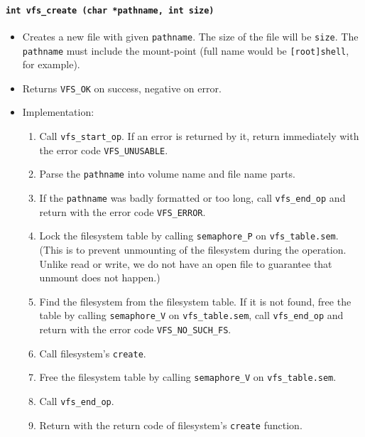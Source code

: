 \documentclass[twoside,a4paper]{report}
\makeatletter
\newenvironment{function}[3]{%
\paragraph{\texttt{#1 {\textbf{#2}} (#3)}}%
\index{#2@\texttt{#2}}%
\begin{itemize}%
}{%
\end{itemize}%
}
\makeatother
\begin{document}
\begin{function}{int}{vfs\_create}{char *pathname, int size}

\item Creates a new file with given \texttt{pathname}. The size of the
file will be \texttt{size}. The \texttt{pathname} must include the
mount-point (full name would be \texttt{[root]shell}, for example).

\item Returns \texttt{VFS\_OK} on success, negative on error.

\item Implementation:
\begin{enumerate}

\item Call \texttt{vfs\_start\_op}. If an error is returned by it,
 return immediately with the error code \texttt{VFS\_UNUSABLE}.

\item Parse the \texttt{pathname} into volume name and file name parts.

\item If the \texttt{pathname} was badly formatted or too long, call
\texttt{vfs\_end\_op} and return with the error code \texttt{VFS\_ERROR}.

\item Lock the filesystem table by calling \texttt{semaphore\_P} on
\texttt{vfs\_table.sem}. (This is to prevent unmounting of the
filesystem during the operation. Unlike read or write, we do not have
an open file to guarantee that unmount does not happen.)

\item Find the filesystem from the filesystem table. If it is not
found, free the table by calling \texttt{semaphore\_V} on
\texttt{vfs\_table.sem}, call \texttt{vfs\_end\_op} and return with
the error code \texttt{VFS\_NO\_SUCH\_FS}.

\item Call filesystem's \texttt{create}.

\item Free the filesystem table by calling \texttt{semaphore\_V} on
\texttt{vfs\_table.sem}.

\item Call \texttt{vfs\_end\_op}.

\item Return with the return code of filesystem's \texttt{create}
function.

\end{enumerate}
\end{function}
\end{document}
